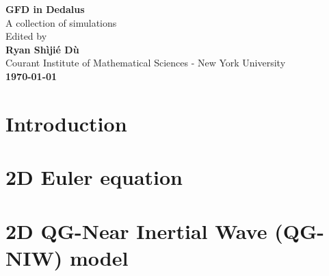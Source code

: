 \documentclass[11pt,letterpaper]{book}
\begin{document}


\begin{titlepage}
    \begin{center}
        \vspace*{4cm}
        \Huge
        \textbf{GFD in Dedalus} \\
        \vspace{0.5cm}
        \LARGE
        {A collection of simulations}\\
        \vspace{3cm}
        Edited by\\
        \vspace{0.5cm}
        \textbf{Ryan Sh\`iji\'e D\`u}\\
        \vspace{0.2cm}
        \normalsize
        {Courant Institute of Mathematical Sciences - New York University}\\
        \vspace{2cm}
        \Large
        \textbf{\today}
        
    \end{center}
\end{titlepage}

\setcounter{tocdepth}{4}
\tableofcontents
\chapter{Introduction}


\chapter{2D Euler equation}\label{chap:2DEuler}


% 

\chapter{2D QG-Near Inertial Wave (QG-NIW) model}


% 




\newpage
\printbibliography
\end{document}
